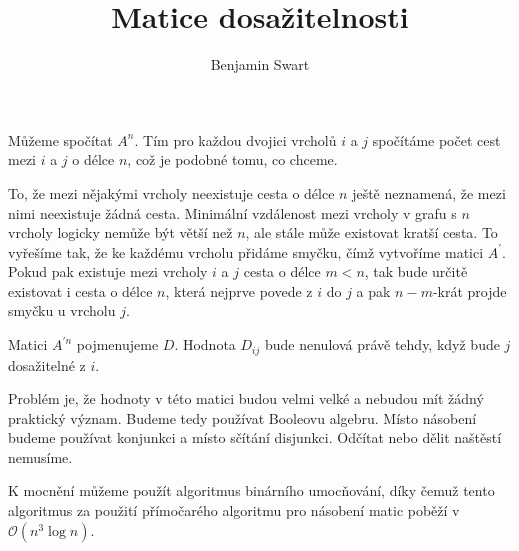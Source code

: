 \documentclass{article}
\title{Matice dosažitelnosti}
\author{Benjamin Swart}
\begin{document}
Můžeme spočítat $A^n$. Tím pro každou dvojici vrcholů $i$ a $j$ spočítáme počet cest mezi $i$ a $j$ o délce $n$, což je podobné tomu, co chceme.

To, že mezi nějakými vrcholy neexistuje cesta o délce $n$ ještě neznamená, že mezi nimi neexistuje žádná cesta. Minimální vzdálenost mezi vrcholy v grafu s $n$ vrcholy logicky nemůže být větší než $n$, ale stále může existovat kratší cesta. To vyřešíme tak, že ke každému vrcholu přidáme smyčku, čímž vytvoříme matici $A^\prime$. Pokud pak existuje mezi vrcholy $i$ a $j$ cesta o délce $m < n$, tak bude určitě existovat i cesta o délce $n$, která nejprve povede z $i$ do $j$ a pak $n - m$-krát projde smyčku u vrcholu $j$.

Matici $A^{\prime n}$ pojmenujeme $D$. Hodnota $D_{i j}$ bude nenulová právě tehdy, když bude $j$ dosažitelné z $i$.

Problém je, že hodnoty v této matici budou velmi velké a nebudou mít žádný praktický význam. Budeme tedy používat Booleovu algebru. Místo násobení budeme používat konjunkci a místo sčítání disjunkci. Odčítat nebo dělit naštěstí nemusíme.

K mocnění můžeme použít algoritmus binárního umocňování, díky čemuž tento algoritmus za použití přímočarého algoritmu pro násobení matic poběží v $\mathcal{O} \left(n^3 \log{n}\right)$.
\end{document}
